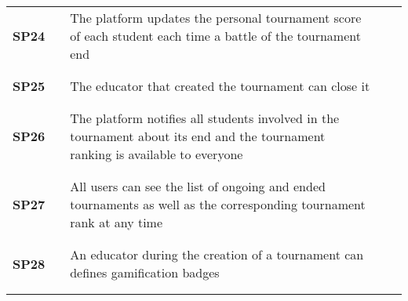\begin{longtable}[H]{l l p{8.5cm} l l}
    \textbf{SP24}             & \vline & The platform updates the personal tournament score of each student each time a battle of the tournament end                           & \vline &                        \\
                              &        &                                                                                                                                       &        &                        \\\hline & & & & \\
    \textbf{SP25}             & \vline & The educator that created the tournament can close it                                                                                 & \vline &                        \\
                              &        &                                                                                                                                       &        &                        \\\hline & & & & \\
    \textbf{SP26}             & \vline & The platform notifies all students involved in the tournament about its end and the tournament ranking is available to everyone       & \vline &                        \\
                              &        &                                                                                                                                       &        &                        \\\hline & & & & \\
    \textbf{SP27}             & \vline & All users can see the list of ongoing and ended tournaments as well as the corresponding tournament rank at any time                  & \vline &                        \\
                              &        &                                                                                                                                       &        &                        \\\hline & & & & \\
    \textbf{SP28}             & \vline & An educator during the creation of a tournament can defines gamification badges                                                       & \vline &                        \\
                              &        &                                                                                                                                       &        &                        \\\hline & & & & \\

\end{longtable}
